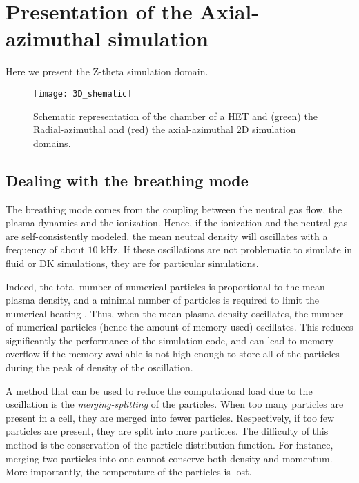 
\section{Presentation of the Axial-azimuthal simulation}


Here we present the Z-theta simulation domain.


\begin{figure}[hbt]
  \centering
  \texttt{[image: 3D\_shematic]}
  \caption{Schematic representation of the chamber of a \ac{HET} and (green) the Radial-azimuthal and (red) the axial-azimuthal 2D simulation domains.}
  \label{fig-3Dschematic}
\end{figure}

\subsection{Dealing with the breathing mode} \label{subsec-breathmod}
The breathing mode comes from the coupling between the neutral gas flow, the plasma dynamics and the ionization.
Hence, if the ionization and the neutral gas are self-consistently modeled, the mean neutral density will oscillates with a frequency of about $10$ kHz.
If these oscillations are not problematic to simulate in fluid or \ac{DK} simulations, they are for particular simulations.

Indeed, the total number of numerical particles is proportional to the mean plasma density, and a minimal number of particles is required to limit the numerical heating \citep{turner2006}.
Thus, when the mean plasma density oscillates, the number of numerical particles (hence the amount of memory used) oscillates.
This reduces significantly the performance of the simulation code, and can lead to memory overflow if the memory available is not high enough to store all of the particles during the peak of density  of the oscillation.

A method that can be used to reduce the computational load due to the oscillation is the \emph{merging-splitting} of the particles.
When too many particles are present in a cell, they are merged into fewer particles.
Respectively, if too few particles are present, they are split into more particles.
The difficulty of this method is the conservation of the particle distribution function.
For instance, merging two particles into one cannot conserve both density and momentum.
More importantly, the temperature of the particles is lost.

